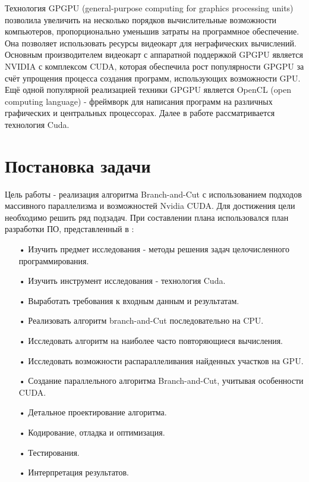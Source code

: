 \documentclass[a4paper,14pt,russian]{extreport}
\begin{document}
\par Технология GPGPU (general-purpose computing for graphics processing units) позволила увеличить на несколько порядков вычислительные возможности компьютеров, пропорционально уменьшив затраты на программное обеспечение. Она позволяет использовать ресурсы видеокарт для неграфических вычислений. Основным производителем видеокарт с аппаратной поддержкой GPGPU является NVIDIA с комплексом CUDA, которая обеспечила рост популярности GPGPU за счёт упрощения процесса создания программ, использующих возможности GPU. Ещё одной популярной реализацией техники GPGPU является OpenCL (open computing language) - фреймворк для написания программ на различных графических и центральных процессорах. Далее в работе рассматривается технология Cuda.


\section{Постановка задачи}

\par Цель работы - реализация алгоритма Branch-and-Cut с использованием подходов массивного параллелизма и возможностей Nvidia CUDA. Для достижения цели необходимо решить ряд подзадач. При составлении плана использовался план разработки ПО, представленный в \cite{mcconnell}: 
  \begin{itemize}
  \item[•] Изучить предмет исследования - методы решения задач целочисленного программирования.
  \item[•] Изучить инструмент исследования - технология Cuda.
  \item[•] Выработать требования к входным данным и результатам.
  \item[•] Реализовать алгоритм branch-and-Cut последовательно на CPU.
  \item[•] Исследовать алгоритм на наиболее часто повторяющиеся вычисления.
  \item[•] Исследовать возможности распараллеливания найденных участков на GPU.
  \item[•] Создание параллельного алгоритма Branch-and-Cut, учитывая особенности CUDA.
  \item[•] Детальное проектирование алгоритма.
  \item[•] Кодирование, отладка и оптимизация.
  \item[•] Тестирования.
  \item[•] Интерпретация результатов.
  \end{itemize}
\end{document}
